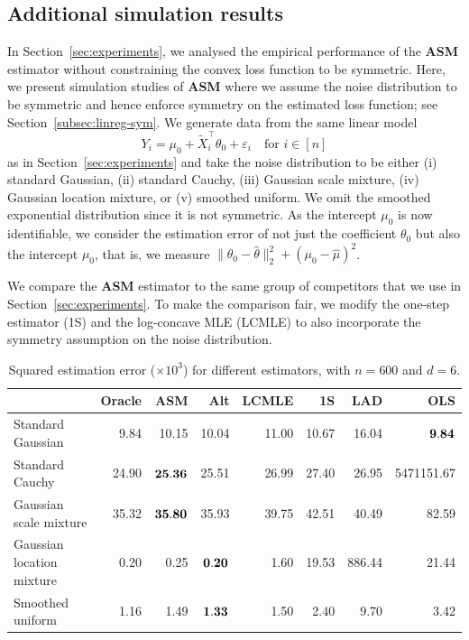 \documentclass[a4paper]{article}
\theoremstyle{definition}
\begin{document}
\subsection{Additional simulation results}

In Section~\ref{sec:experiments}, we analysed the empirical performance of the \textbf{ASM} estimator without constraining the convex loss function to be symmetric. Here, we present simulation studies of \textbf{ASM} where we assume the noise distribution to be symmetric and hence enforce symmetry on the estimated loss function; see Section~\ref{subsec:linreg-sym}. We generate data from the same linear model
\[
Y_i = \mu_0 + \tilde{X}_i^\top \theta_0 + \varepsilon_i \quad \text{for $i \in [n]$}
\]
as in Section~\ref{sec:experiments} and take the noise distribution to be either (i) standard Gaussian, (ii) standard Cauchy, (iii) Gaussian scale mixture, (iv) Gaussian location mixture, or (v) smoothed uniform. We omit the smoothed exponential distribution since it is not symmetric. As the intercept $\mu_0$ is now identifiable, we consider the estimation error of not just the coefficient $\theta_0$ but also the intercept $\mu_0$, that is, we measure $\|\theta_0 - \hat{\theta}\|_2^2 + (\mu_0 - \hat{\mu})^2$. 

We compare the \textbf{ASM} estimator to the same group of competitors that we use in Section~\ref{sec:experiments}. To make the comparison fair, we modify the one-step estimator (1S) and the log-concave MLE (LCMLE) to also incorporate the symmetry assumption on the noise distribution.

\begin{table}[ht]
\centering
\begin{tabular}{|l|r||r|r|r|r|r|r|}
\hline
& Oracle & ASM & Alt & LCMLE & 1S & LAD & OLS \\ 
\hline
Standard Gaussian & 9.84 & 10.15 & 10.04 & 11.00 & 10.67 & 16.04 & $\bf{9.84}$ \\ 
Standard Cauchy & 24.90 & $\bf{25.36}$ & 25.51 & 26.99 & 27.40 & 26.95 & 5471151.67 \\ 
Gaussian scale mixture & 35.32 & $\bf{35.80}$ & 35.93 & 39.75 & 42.51 & 40.49 & 82.59 \\ 
Gaussian location mixture & 0.20 & 0.25 & $\bf{0.20}$ & 1.60 & 19.53 & 886.44 & 21.44 \\ 
Smoothed uniform & 1.16 & 1.49 & $\bf{1.33}$ & 1.50 & 2.40 & 9.70 & 3.42 \\ 
\hline
\end{tabular}
\caption{Squared estimation error ($\times 10^3$) for different estimators, with $n = 600$ and $d=6$.}
\label{tab:MSE-comparison-symm}
\end{table}
\end{document}
